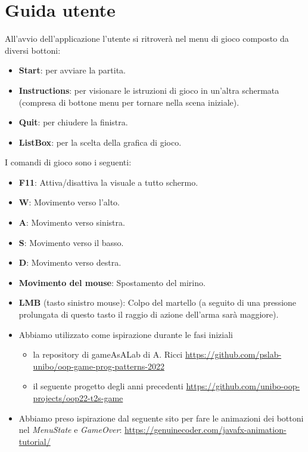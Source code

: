 \documentclass[a4paper,12pt]{report}
\begin{document}
\chapter{Guida utente}

All'avvio dell'applicazione l'utente si ritroverà nel menu di gioco composto da diversi bottoni:
\begin{itemize}
    \item \textbf{Start}: per avviare la partita.
    \item \textbf{Instructions}: per visionare le istruzioni di gioco in un'altra schermata (compresa di bottone menu per tornare nella scena iniziale).
    \item \textbf{Quit}: per chiudere la finistra.
    \item \textbf{ListBox}: per la scelta della grafica di gioco.
\end{itemize}

I comandi di gioco sono i seguenti:
\begin{itemize}
    \item \textbf{F11}: Attiva/disattiva la visuale a tutto schermo.
    \item \textbf{W}: Movimento verso l'alto.
    \item \textbf{A}: Movimento verso sinistra.
    \item \textbf{S}: Movimento verso il basso.
    \item \textbf{D}: Movimento verso destra.
    \item \textbf{Movimento del mouse}: Spostamento del mirino.
    \item \textbf{LMB} (tasto sinistro mouse): Colpo del martello (a seguito di una pressione prolungata di questo tasto il raggio di azione dell'arma sarà maggiore).
\end{itemize}



\begin{itemize}
	\item Abbiamo utilizzato come ispirazione durante le fasi iniziali
    \begin{itemize}
        \item la repository di gameAsALab di A. Ricci \url{https://github.com/pslab-unibo/oop-game-prog-patterns-2022}
        \item il seguente progetto degli anni precedenti \url{https://github.com/unibo-oop-projects/oop22-t2s-game}
    \end{itemize}
    \item Abbiamo preso ispirazione dal seguente sito per fare le animazioni dei bottoni nel \emph{MenuState} e \emph{GameOver}: \url{https://genuinecoder.com/javafx-animation-tutorial/}
\end{itemize}
\end{document}
